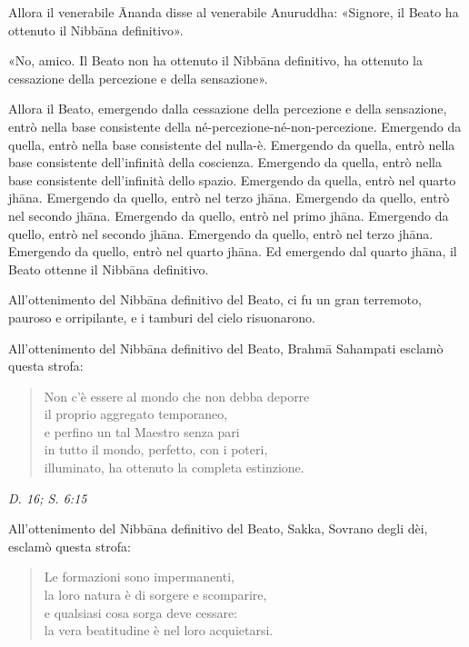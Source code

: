Allora il venerabile Ānanda disse al venerabile Anuruddha: «Signore, il
Beato ha ottenuto il Nibbāna definitivo».


«No, amico. Il Beato non ha ottenuto il Nibbāna definitivo, ha ottenuto
la cessazione della percezione e della sensazione».


Allora il Beato, emergendo dalla cessazione della percezione e della
sensazione, entrò nella base consistente della
né-percezione-né-non-percezione. Emergendo da quella, entrò nella base
consistente del nulla-è. Emergendo da quella, entrò nella base
consistente dell’infinità della coscienza. Emergendo da quella, entrò
nella base consistente dell’infinità dello spazio. Emergendo da quella,
entrò nel quarto jhāna. Emergendo da quello, entrò nel terzo jhāna.
Emergendo da quello, entrò nel secondo jhāna. Emergendo da quello, entrò
nel primo jhāna. Emergendo da quello, entrò nel secondo jhāna. Emergendo
da quello, entrò nel terzo jhāna. Emergendo da quello, entrò nel quarto
jhāna. Ed emergendo dal quarto jhāna, il Beato ottenne il Nibbāna
definitivo.


All’ottenimento del Nibbāna definitivo del Beato, ci fu un gran
terremoto, pauroso e orripilante, e i tamburi del cielo risuonarono.


All’ottenimento del Nibbāna definitivo del Beato, Brahmā Sahampati
esclamò questa strofa:


\begin{quotation}
Non c’è essere al mondo che non debba deporre \\
il proprio aggregato temporaneo, \\
e perfino un tal Maestro senza pari \\
in tutto il mondo, perfetto, con i poteri, \\
illuminato, ha ottenuto la completa estinzione.
\end{quotation}

\emph{D. 16; S. 6:15}


All’ottenimento del Nibbāna definitivo del Beato, Sakka, Sovrano degli
dèi, esclamò questa strofa:


\begin{quotation}
Le formazioni sono impermanenti, \\
la loro natura è di sorgere e scomparire, \\
e qualsiasi cosa sorga deve cessare: \\
la vera beatitudine è nel loro acquietarsi.
\end{quotation}

